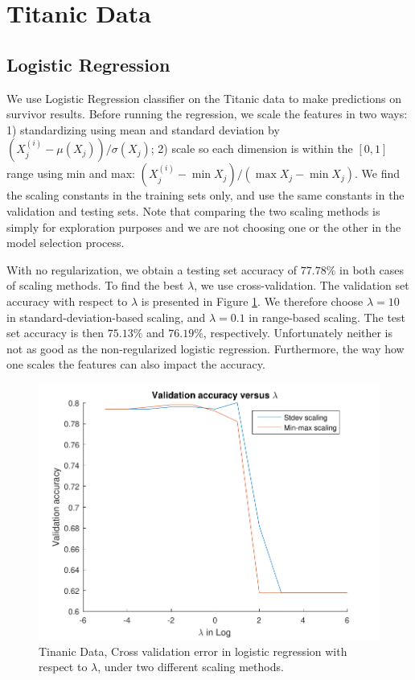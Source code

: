 
\section{Titanic Data}\label{sec:tinanic}

\subsection{Logistic Regression}
We use Logistic Regression classifier on the Titanic data to make predictions on survivor results. Before running the regression, we scale the features in two ways: 1) standardizing using mean and standard deviation by $(X_{j}^{(i)} - \mu(X_{j}))/\sigma(X_{j})$; 2) scale so each dimension is within the $[0, 1]$ range using min and max: $(X_{j}^{(i)} - \min{X_j})/(\max{X_j} - \min{X_j})$. We find the scaling constants in the training sets only, and use the same constants in the validation and testing sets. Note that comparing the two scaling methods is simply for exploration purposes and we are not choosing one or the other in the model selection process.

With no regularization, we obtain a testing set accuracy of $77.78\%$ in both cases of scaling methods. To find the best $\lambda$, we use cross-validation. The validation set accuracy with respect to $\lambda$ is presented in Figure \ref{fig:3_LR_cv}. We therefore choose $\lambda = 10$ in standard-deviation-based scaling, and $\lambda = 0.1$ in range-based scaling. The test set accuracy is then $75.13\%$ and $76.19\%$, respectively. Unfortunately neither is not as good as the non-regularized logistic regression. Furthermore, the way how one scales the features can also impact the accuracy.

\begin{figure}[hb]
\centering
	\includegraphics[scale=0.4]{hw2_3_cv.pdf}
	\caption{Tinanic Data, Cross validation error in logistic regression with respect to $\lambda$, under two different scaling methods.}\label{fig:3_LR_cv}
\end{figure}


